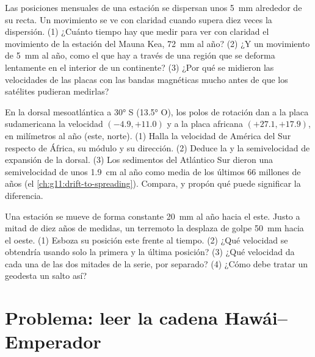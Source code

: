 \begin{exercise}[$\star\star\star$]\label{exo:g11:plate-motions:13}
Las posiciones mensuales de una estación se dispersan unos \qty{5}{mm}
alrededor de su recta. Un movimiento se ve con claridad cuando supera diez
veces la dispersión. (1) ¿Cuánto tiempo hay que medir para ver con claridad
el movimiento de la estación del Mauna Kea, \qty{72}{mm} al año? (2) ¿Y un
movimiento de \qty{5}{mm} al año, como el que hay a través de una región que
se deforma lentamente en el interior de un continente? (3) ¿Por qué se
midieron las velocidades de las placas con las bandas magnéticas mucho antes
de que los satélites pudieran medirlas?
\end{exercise}

\begin{exercise}[$\star\star\star$]\label{exo:g11:plate-motions:14}
En la dorsal mesoatlántica a \ang{30} S (\ang{13.5} O), los polos de rotación
dan a la placa sudamericana la velocidad $(-4.9, +11.0)$ y a la placa
africana $(+27.1, +17.9)$, en milímetros al año (este, norte).
(1) Halla la velocidad de América del Sur respecto de África, su módulo y su
dirección. (2) Deduce la  y la semivelocidad de
expansión de la dorsal. (3) Los sedimentos del Atlántico Sur dieron una
semivelocidad de unos \qty{1.9}{cm} al año como media de los últimos 66
millones de años (el \cref{ch:g11:drift-to-spreading}). Compara, y propón qué
puede significar la diferencia.
\end{exercise}

\begin{exercise}[$\star\star\star$]\label{exo:g11:plate-motions:15}
Una estación se mueve de forma constante \qty{20}{mm} al año hacia el este.
Justo a mitad de diez años de medidas, un terremoto la desplaza de golpe
\qty{50}{mm} hacia el oeste. (1) Esboza su posición este frente al tiempo.
(2) ¿Qué velocidad se obtendría usando solo la primera y la última posición?
(3) ¿Qué velocidad da cada una de las dos mitades de la serie, por separado?
(4) ¿Cómo debe tratar un geodesta un salto así?
\end{exercise}

\section{Problema: leer la cadena Hawái--Emperador}

